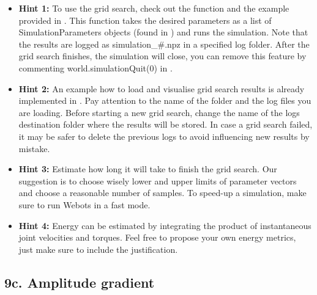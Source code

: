 \documentclass{cmc}
\begin{document}

\begin{itemize}
\item \textbf{Hint 1:} To use the grid search, check out the function
   and the example provided in
  . This function takes the desired parameters as a
  list of SimulationParameters objects (found in
  ) and runs the simulation. Note that the
  results are logged as simulation\_\#.npz in a specified log folder. After the
  grid search finishes, the simulation will close, you can remove this feature
  by commenting world.simulationQuit(0) in .
\item \textbf{Hint 2:} An example how to load and visualise grid
  search results is already implemented in
  . Pay attention to the name of the
  folder and the log files you are loading. Before starting a new grid
  search, change the name of the logs destination folder where the
  results will be stored. In case a grid search failed, it may be
  safer to delete the previous logs to avoid influencing new results
  by mistake.
\item \textbf{Hint 3:} Estimate how long it will take to finish the
  grid search. Our suggestion is to choose wisely lower and upper
  limits of parameter vectors and choose a reasonable number of
  samples. To speed-up a simulation, make sure to run Webots in a fast
  mode.
\item \textbf{Hint 4:} Energy can be estimated by integrating the
  product of instantaneous joint velocities and torques. Feel free to
  propose your own energy metrics, just make sure to include the
  justification.
\end{itemize}


\subsection*{9c. Amplitude gradient}
\label{sec:amplitude-gradient}
\end{document}
